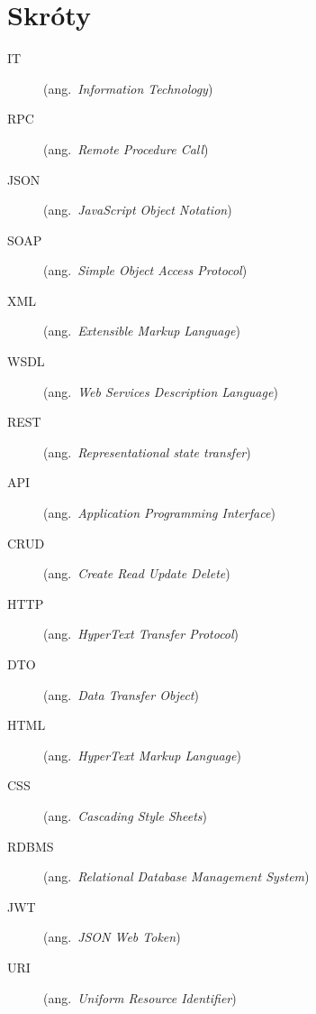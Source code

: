 \chapter*{Skróty}\mbox{}
\label{sec:skroty}
\noindent
\begin{description}
  \item[IT] (ang.\ \emph{Information Technology})
	\item[RPC] (ang.\ \emph{Remote Procedure Call})
	\item[JSON] (ang.\ \emph{JavaScript Object Notation})
	\item[SOAP] (ang.\ \emph{Simple Object Access Protocol})
  \item[XML] (ang.\ \emph{Extensible Markup Language})
  \item[WSDL] (ang.\ \emph{Web Services Description Language})
	\item[REST] (ang.\ \emph{Representational state transfer}) 
	\item[API] (ang.\ \emph{Application Programming Interface}) 
	\item[CRUD] (ang.\ \emph{Create Read Update Delete}) 
	\item[HTTP] (ang.\ \emph{HyperText Transfer Protocol}) 
	\item[DTO] (ang.\ \emph{Data Transfer Object}) 
	\item[HTML] (ang.\ \emph{HyperText Markup Language}) 
	\item[CSS] (ang.\ \emph{Cascading Style Sheets}) 
	\item[RDBMS] (ang.\ \emph{Relational Database Management System}) 
	\item[JWT] (ang.\ \emph{JSON Web Token})
	\item[URI] (ang.\ \emph{Uniform Resource Identifier})
\end{description}
